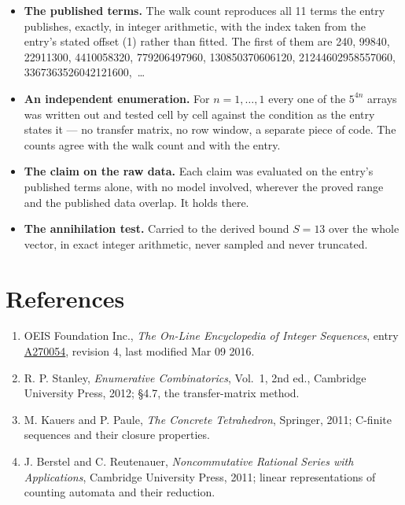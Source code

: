 \documentclass[11pt]{article}
\theoremstyle{definition}
\begin{document}
\begin{itemize}

\item {\bfseries The published terms.} The walk count reproduces all 11 terms the entry publishes, exactly, in integer arithmetic, with the index taken from the entry's stated offset (1) rather than fitted. The first of them are 240, 99840, 22911300, 4410058320, 779206497960, 130850370606120, 21244602958557060, 3367363526042121600,~\dots

\item {\bfseries An independent enumeration.} For $n = 1,\dots,1$ every one of the $5^{4n}$ arrays was written out and tested cell by cell against the condition as the entry states it --- no transfer matrix, no row window, a separate piece of code. The counts agree with the walk count and with the entry.

\item {\bfseries The claim on the raw data.} Each claim was evaluated on the entry's published terms alone, with no model involved, wherever the proved range and the published data overlap. It holds there.

\item {\bfseries The annihilation test.} Carried to the derived bound $S = 13$ over the whole vector, in exact integer arithmetic, never sampled and never truncated.

\end{itemize}

\section{References}

\begin{enumerate}

\item OEIS Foundation Inc., \emph{The On-Line Encyclopedia of Integer Sequences}, entry \href{https://oeis.org/A270054}{A270054}, revision 4, last modified Mar 09 2016.

\item R. P. Stanley, \emph{Enumerative Combinatorics}, Vol.~1, 2nd ed., Cambridge University Press, 2012; \S4.7, the transfer-matrix method.

\item M. Kauers and P. Paule, \emph{The Concrete Tetrahedron}, Springer, 2011; C-finite sequences and their closure properties.

\item J. Berstel and C. Reutenauer, \emph{Noncommutative Rational Series with Applications}, Cambridge University Press, 2011; linear representations of counting automata and their reduction.

\end{enumerate}
\end{document}

